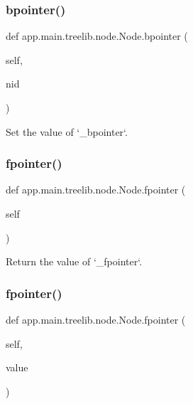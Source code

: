 \subsubsection{\texorpdfstring{bpointer()}{bpointer()}\hspace{0.1cm}{\footnotesize\ttfamily [2/2]}}
{\footnotesize\ttfamily def app.\+main.\+treelib.\+node.\+Node.\+bpointer (\begin{DoxyParamCaption}\item[{}]{self,  }\item[{}]{nid }\end{DoxyParamCaption})}

\begin{DoxyVerb}Set the value of `_bpointer`.\end{DoxyVerb}
 \mbox{\label{classapp_1_1main_1_1treelib_1_1node_1_1Node_a98442ca873604524b806978aca72addb}} 
\subsubsection{\texorpdfstring{fpointer()}{fpointer()}\hspace{0.1cm}{\footnotesize\ttfamily [1/2]}}
{\footnotesize\ttfamily def app.\+main.\+treelib.\+node.\+Node.\+fpointer (\begin{DoxyParamCaption}\item[{}]{self }\end{DoxyParamCaption})}

\begin{DoxyVerb}Return the value of `_fpointer`.\end{DoxyVerb}
 \mbox{\label{classapp_1_1main_1_1treelib_1_1node_1_1Node_afc312003b4159b00d8ed55fed0680474}} 
\subsubsection{\texorpdfstring{fpointer()}{fpointer()}\hspace{0.1cm}{\footnotesize\ttfamily [2/2]}}
{\footnotesize\ttfamily def app.\+main.\+treelib.\+node.\+Node.\+fpointer (\begin{DoxyParamCaption}\item[{}]{self,  }\item[{}]{value }\end{DoxyParamCaption})}

